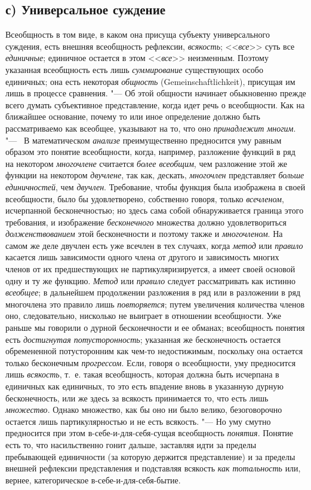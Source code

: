 {\subsection[с) Универсальное суждение]{с) Универсальное суждение}
Всеобщность в том виде, в каком она присуща субъекту
универсального суждения, есть внешняя всеобщность рефлексии,
{\em всякость};
<<{\em все}>> суть все
{\em единичные};
единичное остается в этом
<<{\em все}>> неизменным.
Поэтому указанная всеобщность есть лишь
{\em суммирование}
существующих особо единичных; она есть некоторая
{\em общность} (Gemeinschaftlichkeit),
присущая им лишь в процессе сравнения. "--- Об
этой общности начинает обыкновенно прежде всего думать субъективное
представление, когда идет речь о всеобщности. Как на
ближайшее основание, почему то или иное определение должно быть
рассматриваемо как всеобщее, указывают на то, что оно
{\em принадлежит многим}. "---
\ В математическом
{\em анализе}
преимущественно предносится уму равным образом это понятие
всеобщности, когда, например, разложение функций в ряд на некотором
{\em многочлене}
считается {\em более
всеобщим}, чем разложение этой же функции на некотором
{\em двучлене}, так как,
дескать, {\em многочлен}
представляет {\em больше
единичностей}, чем
{\em двучлен}.
Требование, чтобы функция была изображена в своей
всеобщности, было бы удовлетворено, собственно говоря, только
{\em всечленом},
исчерпанной бесконечностью; но здесь сама собой
обнаруживается граница этого требования, и изображение
{\em бесконечного}
множества должно удовлетвориться
{\em долженствованием}
этой бесконечности и поэтому также и
{\em многочленом}. На
самом же деле двучлен есть уже всечлен в тех случаях, когда
{\em метод} или
{\em правило} касается
лишь зависимости одного члена от другого и зависимость многих членов от их
предшествующих не партикуляризируется, а имеет своей основой одну и ту же
функцию. {\em Метод} или
{\em правило} следует
рассматривать как истинно
{\em всеобщее}; в
дальнейшем продолжении разложения в ряд или в разложении в ряд многочлена
это правило лишь {\em повторяется};
путем увеличения количества членов оно, следовательно,
нисколько не выиграет в отношении всеобщности. Уже раньше мы говорили о
дурной бесконечности и ее обманах; всеобщность понятия есть
{\em достигнутая потусторонность};
указанная же бесконечность остается обремененной
потусторонним как чем-то недостижимым, поскольку она остается только
бесконечным {\em прогрессом}.
Если, говоря о всеобщности, уму предносится лишь
{\em всякость}, т.~е.
такая всеобщность, которая должна быть исчерпана в единичных как единичных,
то это есть впадение вновь в указанную дурную бесконечность, или же здесь
за всякость принимается то, что есть лишь
{\em множество}. Однако
множество, как бы оно ни было велико, безоговорочно остается лишь
партикулярностью и не есть всякость. "--- Но уму смутно
предносится при этом в-себе-и-для-себя-сущая всеобщность
{\em понятия}. Понятие
есть то, что насильственно гонит дальше, заставляя идти за пределы
пребывающей единичности (за которую держится представление) и за пределы
внешней рефлексии представления и подставляя всякость
{\em как тотальность}
или, вернее, категорическое в-себе-и-для-себя-бытие.

}
